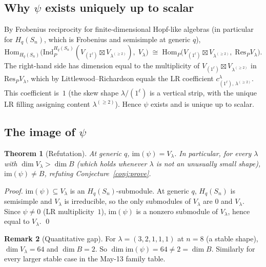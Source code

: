\documentclass[11pt]{article}
\newtheorem{theorem}{Theorem}
\theoremstyle{definition}
\newtheorem{remark}[theorem]{Remark}
\begin{document}
\subsection{Why $\psi$ exists uniquely up to scalar}

By Frobenius reciprocity for finite-dimensional Hopf-like algebras
(in particular for $H_q(S_n)$, which is Frobenius and semisimple at
generic $q$),
\[
   \mathrm{Hom}_{H_q(S_n)}\!\bigl(\mathrm{Ind}_P^{H_q(S_n)}(V_{(1^\ell)} \boxtimes V_{\lambda^{(\ge 2)}}),\; V_\lambda \bigr)
   \;\cong\; \mathrm{Hom}_P\!\bigl( V_{(1^\ell)} \boxtimes V_{\lambda^{(\ge 2)}},\; \mathrm{Res}_P V_\lambda \bigr).
\]
The right-hand side has dimension equal to the multiplicity of
$V_{(1^\ell)} \boxtimes V_{\lambda^{(\ge 2)}}$ in $\mathrm{Res}_P V_\lambda$, which by
Littlewood--Richardson equals the LR coefficient
$c^\lambda_{(1^\ell),\,\lambda^{(\ge 2)}}$. This coefficient is~$1$
(the skew shape $\lambda / (1^\ell)$ is a vertical strip, with the
unique LR filling assigning content $\lambda^{(\ge 2)}$). Hence $\psi$
exists and is unique up to scalar.

\subsection{The image of $\psi$}

\begin{theorem}[Refutation]\label{thm:refute}
At generic $q$, $\mathrm{im}(\psi) = V_\lambda$. In particular, for
every $\lambda$ with $\dim V_\lambda > \dim B$ (which holds whenever
$\lambda$ is not an unusually small shape), $\mathrm{im}(\psi) \ne B$,
refuting Conjecture~\ref{conj:prove}.
\end{theorem}

\begin{proof}
$\mathrm{im}(\psi) \subseteq V_\lambda$ is an $H_q(S_n)$-submodule. At
generic $q$, $H_q(S_n)$ is semisimple and $V_\lambda$ is irreducible,
so the only submodules of $V_\lambda$ are $0$ and $V_\lambda$. Since
$\psi \ne 0$ (LR multiplicity~$1$), $\mathrm{im}(\psi)$ is a nonzero
submodule of $V_\lambda$, hence equal to $V_\lambda$. \qed
\end{proof}

\begin{remark}[Quantitative gap]
For $\lambda = (3,2,1,1,1)$ at $n = 8$ (a stable shape),
$\dim V_\lambda = 64$ and $\dim B = 2$. So
$\dim \mathrm{im}(\psi) = 64 \ne 2 = \dim B$. Similarly for every
larger stable case in the May-13 family table.
\end{remark}
\end{document}
